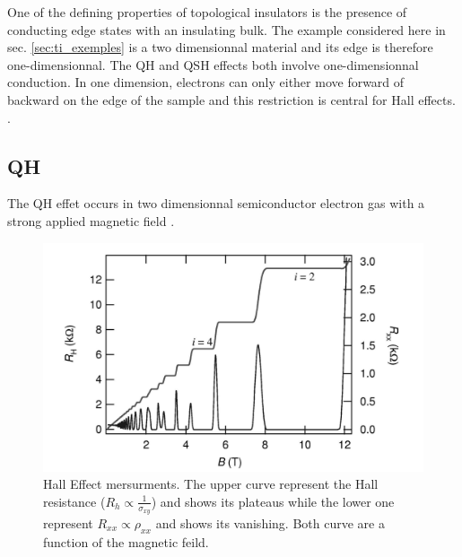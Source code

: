 One of the defining properties of topological insulators is the presence of conducting edge states with an insulating bulk. The example considered here in sec. \ref{sec:ti_exemples} is a two dimensionnal material and its edge is therefore one-dimensionnal. The QH and QSH effects both involve one-dimensionnal conduction. In one dimension, electrons can only either move forward of backward on the edge of the sample and this restriction is central for Hall effects. \cite{qi_quantum_2010}. 
\subsection{QH}
The QH effet occurs in two dimensionnal semiconductor electron gas with a strong applied magnetic field \cite{qi_quantum_2010}.

\begin{figure}[h]
    \includegraphics[width=\columnwidth]{sections/visuel/Hall_effect.png}
    \caption{Hall Effect mersurments. The upper curve represent the Hall resistance ($R_h \propto \frac{1}{\sigma_{xy}}$) and shows its plateaus while the lower one represent $R_{xx} \propto \rho_{xx}$ and shows its vanishing. Both curve are a function of the magnetic feild. \cite{jeckelmann_quantum_nodate}}
    \label{fig:Hall_effet}
\end{figure}

